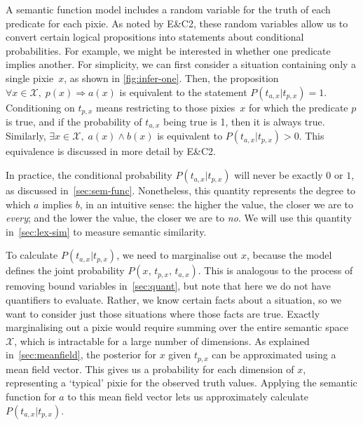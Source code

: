 \documentclass[a4paper,11pt]{article}
\begin{document}
A semantic function model includes a random variable 
for the truth of each predicate for each pixie.
As noted by E\&C2,
these random variables allow us to convert certain logical propositions
into statements about conditional probabilities.
For example, we might be interested in whether one predicate implies another.
For simplicity, we can first consider a situation containing only a single pixie~$x$,
as shown in \cref{fig:infer-one}.
Then, the proposition ${\forall x\in\mathcal{X},\; p(x) \Rightarrow a(x)}$
is equivalent to the statement ${P(t_{a,x}|t_{p,x}) = 1}$.
Conditioning on $t_{p,x}$ means restricting to those pixies~$x$
for which the predicate $p$ is true,
and if the probability of $t_{a,x}$ being true is 1, then it is always true.
Similarly, ${\exists x\in\mathcal{X},\; a(x) \land b(x)}$
is equivalent to ${P(t_{a,x}|t_{p,x}) > 0}$.
This equivalence is discussed in more detail by E\&C2.

In practice, the conditional probability ${P(t_{a,x}|t_{p,x})}$ will never be exactly $0$ or $1$,
as discussed in~\cref{sec:sem-func}.
Nonetheless, this quantity
represents the degree to which $a$ implies $b$, in an intuitive sense:
the higher the value, the closer we are to \textit{every};
and the lower the value, the closer we are to \textit{no}.
We will use this quantity in~\cref{sec:lex-sim} to measure semantic similarity.

To calculate ${P(t_{a,x}|t_{p,x})}$, we need to marginalise out $x$,
because the model defines the joint probability ${P(x,\,t_{p,x},\,t_{a,x})}$.
This is analogous to the process of removing bound variables in~\cref{sec:quant},
but note that here we do not have quantifiers to evaluate.
Rather, we know certain facts about a situation,
so we want to consider just those situations where those facts are true.
Exactly marginalising out a pixie would require
summing over the entire semantic space $\mathcal{X}$,
which is intractable for a large number of dimensions.
As explained in~\cref{sec:meanfield},
the posterior for $x$ given $t_{p,x}$
can be approximated using a mean field vector.
This gives us a probability for each dimension of $x$,
representing a `typical' pixie for the observed truth values.
Applying the semantic function for $a$ to this mean field vector
lets us approximately calculate ${P(t_{a,x}|t_{p,x})}$.
\end{document}
